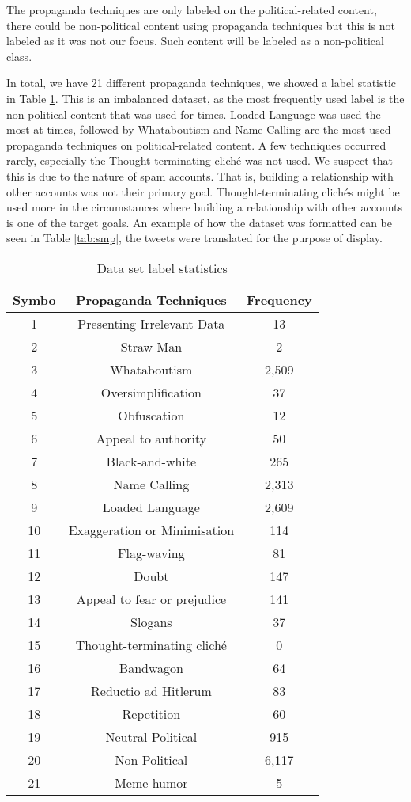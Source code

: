 \documentclass[sigconf]{acmart}
\begin{document}
The propaganda techniques are only labeled on the political-related content, there could be non-political content using propaganda techniques but this is not labeled as it was not our focus. Such content will be labeled as a non-political class.   

In total, we have 21 different propaganda techniques, we showed a label statistic in Table \ref{tab:freq}. This is an imbalanced dataset, as the most frequently used label is the non-political content that was used for  times.  Loaded Language was used the most at  times, followed by Whataboutism  and Name-Calling  are the most used propaganda techniques on political-related content. A few techniques occurred rarely, especially the Thought-terminating cliché was not used. We suspect that this is due to the nature of spam accounts. That is, building a relationship with other accounts was not their primary goal. Thought-terminating clichés might be used more in the circumstances where building a  relationship with other accounts is one of the target goals. An example of how the dataset was formatted can be seen in Table \ref{tab:smp}, the tweets were translated for the purpose of display. 

\begin{table}[ht]
  \caption{Data set label statistics}
  \label{tab:freq}
  \begin{tabular}{ccc}
    \toprule
    Symbo & Propaganda Techniques & Frequency\\
    \midrule
    1 & Presenting Irrelevant Data & 13\\
    2 & Straw Man & 2\\
    3 & Whataboutism & 2,509\\
    4 & Oversimplification & 37\\
    5& Obfuscation& 12\\
    6& Appeal to authority& 50\\
    7& Black-and-white & 265\\
    8& Name Calling& 2,313\\
    9& Loaded Language& 2,609\\
    10& Exaggeration or Minimisation& 114\\
    11& Flag-waving& 81\\
    12& Doubt& 147\\
    13& Appeal to fear or prejudice & 141\\
    14& Slogans& 37\\
    15& Thought-terminating cliché& 0\\
    16& Bandwagon& 64\\
    17& Reductio ad Hitlerum& 83\\
    18& Repetition& 60\\
    19& Neutral Political & 915\\
    20& Non-Political& 6,117\\
    21& Meme humor& 5\\
    
  \bottomrule
\end{tabular}
\end{table}
\end{document}
